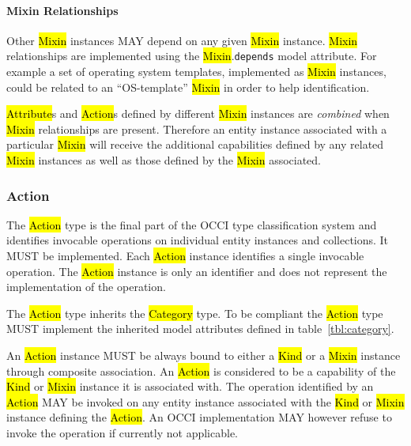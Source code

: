\documentclass[10pt,a4paper]{article}
\begin{document}
\paragraph*{Mixin Relationships}

Other \hl{Mixin} instances MAY depend on any given \hl{Mixin} instance.
\hl{Mixin} relationships are implemented using the \hl{Mixin}.{\tt depends}
model attribute.
For example a set of operating
system templates, implemented as \hl{Mixin} instances, could be
related to an ``OS-template'' \hl{Mixin} in order to help
identification.

\hl{Attribute}s and \hl{Action}s defined by different \hl{Mixin} instances
are {\em combined} when \hl{Mixin} relationships are present. Therefore an
entity instance associated with a particular \hl{Mixin} will receive
the additional capabilities defined by any related \hl{Mixin}
instances as well as those defined by the \hl{Mixin} associated.


\subsubsection{Action}
The \hl{Action} type is the final part of the OCCI type classification system
and identifies invocable operations on individual entity instances and collections.
It MUST be implemented.
Each \hl{Action} instance identifies a single invocable operation.
The \hl{Action} instance is only an identifier and does not represent the
implementation of the operation.

The \hl{Action} type inherits the \hl{Category} type. To be compliant
the \hl{Action} type MUST implement the inherited model attributes defined in
table~\ref{tbl:category}.


An \hl{Action} instance MUST be always bound to either a \hl{Kind} or a \hl{Mixin}
instance through composite association. An \hl{Action} is considered
to be a capability of the \hl{Kind} or \hl{Mixin} instance it is
associated with.  The operation identified by an \hl{Action} MAY be invoked on
any entity
instance associated with the \hl{Kind} or \hl{Mixin} instance defining
the \hl{Action}. An OCCI implementation MAY however refuse
to invoke the operation if currently not applicable.
\end{document}
